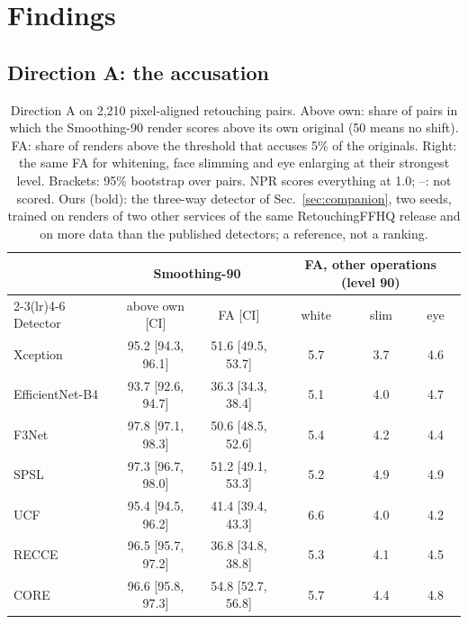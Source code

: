 \documentclass[conference]{IEEEtran}
\begin{document}
\section{Findings}
\label{sec:findings}

\subsection{Direction A: the accusation}
\label{sec:accuse}
\begin{table}[t]
\centering
\caption{Direction A on 2,210 pixel-aligned retouching pairs. Above own: share of pairs in which the Smoothing-90 render
scores above its own original (50 means no shift). FA: share of renders above the threshold that accuses 5\% of the
originals. Right: the same FA for whitening, face slimming and eye enlarging at their strongest level. Brackets: 95\%
bootstrap over pairs. NPR scores everything at 1.0; --: not scored. Ours (bold): the three-way detector of Sec.~\ref{sec:companion}, two seeds, trained on renders of two other services of the same RetouchingFFHQ release and on more data than the published detectors; a reference, not a ranking.}
\label{tab:dirA}
\scriptsize
\setlength{\tabcolsep}{2.5pt}
\begin{tabular}{@{}l cc ccc@{}}
\toprule
 & \multicolumn{2}{c}{Smoothing-90} & \multicolumn{3}{c}{FA, other operations (level 90)} \\
\cmidrule(lr){2-3}\cmidrule(lr){4-6}
Detector & above own [CI] & FA [CI] & white & slim & eye \\
\midrule
Xception & 95.2 [94.3, 96.1] & 51.6 [49.5, 53.7] & 5.7 & 3.7 & 4.6 \\
EfficientNet-B4 & 93.7 [92.6, 94.7] & 36.3 [34.3, 38.4] & 5.1 & 4.0 & 4.7 \\
F3Net & 97.8 [97.1, 98.3] & 50.6 [48.5, 52.6] & 5.4 & 4.2 & 4.4 \\
SPSL & 97.3 [96.7, 98.0] & 51.2 [49.1, 53.3] & 5.2 & 4.9 & 4.9 \\
UCF & 95.4 [94.5, 96.2] & 41.4 [39.4, 43.3] & 6.6 & 4.0 & 4.2 \\
RECCE & 96.5 [95.7, 97.2] & 36.8 [34.8, 38.8] & 5.3 & 4.1 & 4.5 \\
CORE & 96.6 [95.8, 97.3] & 54.8 [52.7, 56.8] & 5.7 & 4.4 & 4.8 \\

\end{tabular}
\end{table}
\end{document}
